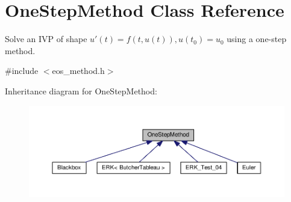 \hypertarget{classOneStepMethod}{}\section{One\+Step\+Method Class Reference}
\label{classOneStepMethod}


Solve an I\+VP of shape $u'(t) = f(t, u(t)), u(t_0) = u_0$ using a one-\/step method.  




{\ttfamily \#include $<$eos\+\_\+method.\+h$>$}



Inheritance diagram for One\+Step\+Method\+:
\nopagebreak
\begin{figure}[H]
\begin{center}
\leavevmode
\includegraphics[width=350pt]{classOneStepMethod__inherit__graph}
\end{center}
\end{figure}
